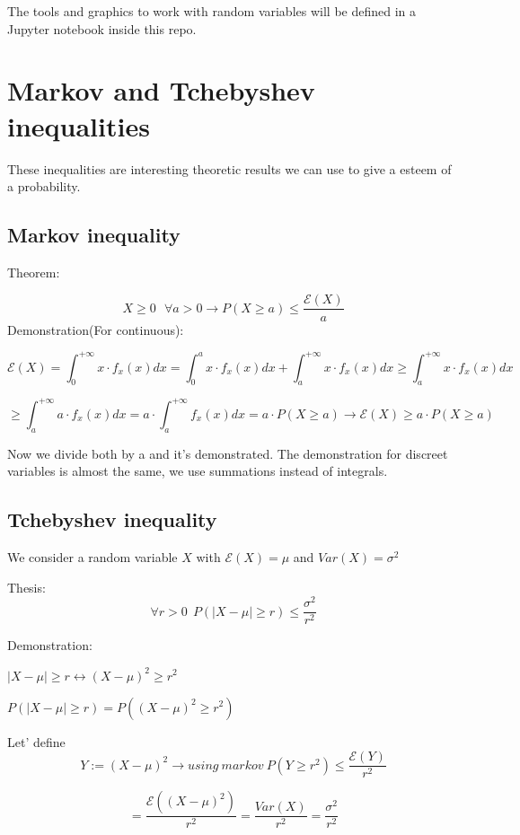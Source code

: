 \documentclass{article}
\begin{document}
The tools and graphics to work with random variables will be defined in a Jupyter notebook inside this repo.

\section{Markov and Tchebyshev inequalities}

These inequalities are interesting theoretic results we can use to give a esteem of a probability.
\bigskip

\subsection{Markov inequality}

Theorem:
\bigskip

$$X \geq 0 \ \ \  \forall a > 0 \rightarrow P(X \geq a) \leq \frac{\mathcal E(X)}{a}$$
\bigskip
Demonstration(For continuous):

$$\mathcal E(X) = \int_{0}^{+ \infty} x \cdot f_x(x)dx = \int_{0}^ax\cdot f_x(x)dx + \int_{a}^{+ \infty} x \cdot f_x(x)dx \geq \int_{a}^{+ \infty} x \cdot f_x(x)dx$$

\bigskip 

$$\geq \int_{a}^{+ \infty} a \cdot f_x(x)dx = a \cdot \int_{a}^{+ \infty} f_x(x)dx = a \cdot P(X \geq a) \longrightarrow \mathcal E(X) \geq a \cdot P(X \geq a)$$

Now we divide both by a and it's demonstrated. The demonstration for discreet variables is almost the same, we use summations instead of integrals.

\subsection{Tchebyshev inequality}

We consider a random variable $X$ with $\mathcal E(X) = \mu$ and $Var(X) = \sigma^2$

Thesis:
$$\forall r > 0 \ \ P(|X - \mu| \geq r) \leq \frac{\sigma^2}{r^2}$$
\bigskip

Demonstration:

$|X - \mu| \geq r \leftrightarrow (X - \mu)^2 \geq r^2$
\bigskip

$P(|X - \mu| \geq r) = P((X - \mu)^2 \geq r^2)$

Let' define $$Y:= (X - \mu)^2 \rightarrow using \ markov \ P(Y \geq r^2) \leq \frac{\mathcal E(Y)}{r^2}$$

$$= \frac{\mathcal E((X- \mu)^2)}{r^2} = \frac{Var(X)}{r^2} = \frac{\sigma^2}{r^2}$$
\end{document}

